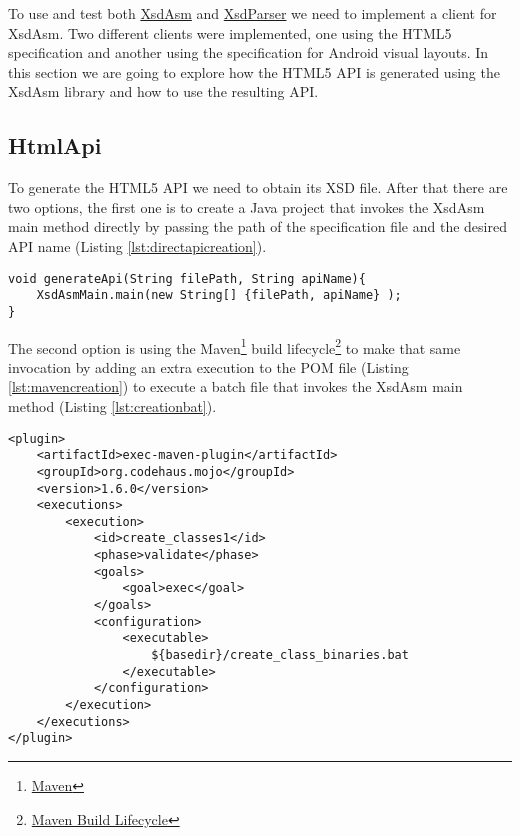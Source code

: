 To use and test both \hyperref[sec:xsdasm]{XsdAsm} and \hyperref[sec:xsdparser]{XsdParser} we need to implement a client for XsdAsm. Two different clients were implemented, one using the \ac{HTML}5 specification and another using the specification for Android visual layouts. In this section we are going to explore how the \ac{HTML}5 \ac{API} is generated using the XsdAsm library and how to use the resulting \ac{API}.

\subsection{HtmlApi}

To generate the \ac{HTML}5 \ac{API} we need to obtain its \ac{XSD} file. After that there are two options, the first one is to create a Java project that invokes the XsdAsm main method directly by passing the path of the specification file and the desired \ac{API} name (Listing \ref{lst:directapicreation}).

\bigskip


\begin{minipage}{\linewidth}
\begin{lstlisting}[caption={API creation},label={lst:directapicreation}]
void generateApi(String filePath, String apiName){
    XsdAsmMain.main(new String[] {filePath, apiName} );    
}
\end{lstlisting}
\end{minipage}

\noindent
The second option is using the Maven\footnote{\href{https://maven.apache.org/}{Maven}} build lifecycle\footnote{\href{https://maven.apache.org/guides/introduction/introduction-to-the-lifecycle.html\#Build_Lifecycle_Basics}{Maven Build Lifecycle}} to make that same invocation by adding an extra execution to the \ac{POM} file (Listing \ref{lst:mavencreation}) to execute a batch file that invokes the XsdAsm main method (Listing \ref{lst:creationbat}). 

\bigskip


\begin{minipage}{\linewidth}
\begin{lstlisting}[caption={Maven API compile classes plugin},label={lst:mavencreation}]
<plugin>
    <artifactId>exec-maven-plugin</artifactId>
    <groupId>org.codehaus.mojo</groupId>
    <version>1.6.0</version>
    <executions>
        <execution>
            <id>create_classes1</id>
            <phase>validate</phase>
            <goals>
                <goal>exec</goal>
            </goals>
            <configuration>
                <executable>
                    ${basedir}/create_class_binaries.bat
                </executable>
            </configuration>
        </execution>
    </executions>
</plugin>
\end{lstlisting}
\end{minipage}


